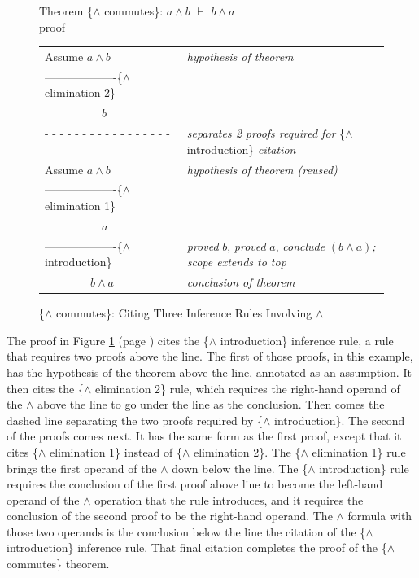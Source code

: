 \begin{figure}
Theorem \{$\wedge$ commutes\}: $a \wedge b$ $\vdash$ $b \wedge a$ \\
proof
\begin{center}
\begin{tabular}{ll}
Assume $a \wedge b$                             &\emph{hypothesis of theorem}\\
-------------------\{$\wedge$ elimination 2\}   &\\
~~~~~~~~~~$b$                                   &\\
 - - - - - - - - - - - - - - - - - - - - - - - -&\emph{separates 2 proofs required for }\{$\wedge$ introduction\} \emph{citation}\\
Assume $a \wedge b$                             &\emph{hypothesis of theorem (reused)}\\
-------------------\{$\wedge$ elimination 1\}   &\\
~~~~~~~~~~$a$                                   &\\
-------------------\{$\wedge$ introduction\}    &\emph{proved} $b$, \emph{proved} $a$, \emph{conclude} $(b \wedge a)$\emph{; scope extends to top}\\
~~~~~~~~$b \wedge a$                            &\emph{conclusion of theorem}\\
\end{tabular}
\end{center}
\caption{\{$\wedge$ commutes\}: Citing Three Inference Rules Involving $\wedge$}
\label{fig:and-commutes-proof}
\end{figure}

The proof in
Figure \ref{fig:and-commutes-proof} (page \pageref{fig:and-commutes-proof})
cites the \{$\wedge$ introduction\} inference rule,
a rule that requires two proofs above the line.
The first of those proofs, in this example, has the hypothesis
of the theorem above the line, annotated as an assumption.
It then cites the \{$\wedge$ elimination 2\} rule,
which requires the right-hand operand of the $\wedge$
above the line to go under the line as the conclusion.
Then comes the dashed line separating
the two proofs required by \{$\wedge$ introduction\}.
The second of the proofs comes next.
It has the same form as the first proof,
except that it cites \{$\wedge$ elimination 1\} instead of \{$\wedge$ elimination 2\}.
The \{$\wedge$ elimination 1\} rule brings the first operand of the $\wedge$
down below the line.
The \{$\wedge$ introduction\} rule requires the
conclusion of the first proof above line to
become the left-hand operand of the $\wedge$
operation that the rule introduces,
and it requires the conclusion of the second
proof to be the right-hand operand.
The $\wedge$ formula with those two operands
is the conclusion below the line the citation of the \{$\wedge$ introduction\} inference rule.
That final citation completes the proof of the \{$\wedge$ commutes\} theorem.


